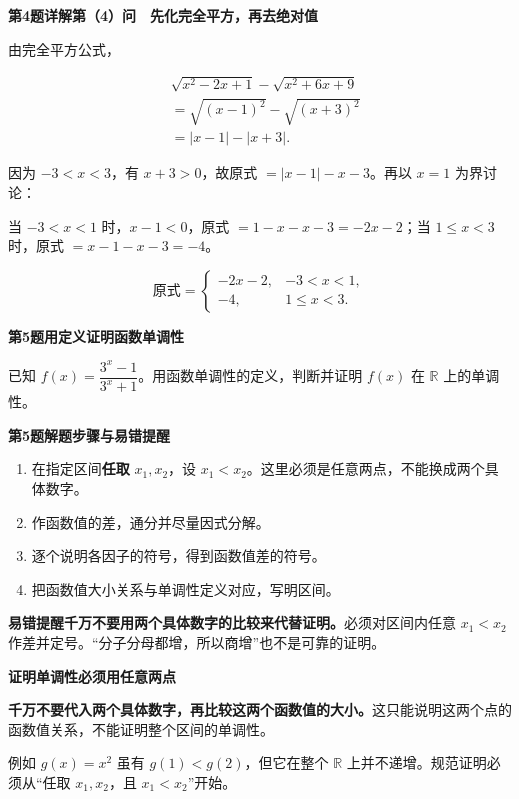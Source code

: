 \documentclass[UTF8,10pt,aspectratio=169]{ctexbeamer}
\newcommand{\PageHeading}[1]{\begin{center}{\Large\bfseries #1}\end{center}\vspace{0.12cm}}
\begin{document}
\begin{frame}[t]
\PageHeading{第4题详解\quad 第（4）问　先化完全平方，再去绝对值}
由完全平方公式，
\par
\pause
\[\begin{aligned}&\sqrt{x^2-2x+1}-\sqrt{x^2+6x+9}\\&=\sqrt{(x-1)^2}-\sqrt{(x+3)^2}\\&=|x-1|-|x+3|.\end{aligned}\]
\par
因为 $-3<x<3$，有 $x+3>0$，故原式 $=|x-1|-x-3$。再以 $x=1$ 为界讨论：
\par
当 $-3<x<1$ 时，$x-1<0$，原式 $=1-x-x-3=-2x-2$；当 $1\le x<3$ 时，原式 $=x-1-x-3=-4$。
\par
\[\boxed{\text{原式}=\begin{cases}-2x-2,&-3<x<1,\\-4,&1\le x<3.\end{cases}}\]
\par
\end{frame}
\begin{frame}[t]
\PageHeading{第5题\quad 用定义证明函数单调性}
已知 $f(x)=\dfrac{3^x-1}{3^x+1}$。用函数单调性的定义，判断并证明 $f(x)$ 在 $\mathbb R$ 上的单调性。
\par
\end{frame}
\begin{frame}[t]
\PageHeading{第5题\quad 解题步骤与易错提醒}
\begin{enumerate}\item 在指定区间\textbf{任取} $x_1,x_2$，设 $x_1<x_2$。这里必须是任意两点，不能换成两个具体数字。
\item 作函数值的差，通分并尽量因式分解。
\item 逐个说明各因子的符号，得到函数值差的符号。
\item 把函数值大小关系与单调性定义对应，写明区间。\end{enumerate}
\par
\pause
\vspace{0.18cm}\textbf{易错提醒}\quad \textbf{千万不要用两个具体数字的比较来代替证明。}必须对区间内任意 $x_1<x_2$ 作差并定号。“分子分母都增，所以商增”也不是可靠的证明。
\par
\end{frame}
\begin{frame}[t]
\PageHeading{证明单调性必须用任意两点}
\textbf{千万不要代入两个具体数字，再比较这两个函数值的大小。}这只能说明这两个点的函数值关系，不能证明整个区间的单调性。
\par
\pause
例如 $g(x)=x^2$ 虽有 $g(1)<g(2)$，但它在整个 $\mathbb R$ 上并不递增。规范证明必须从“任取 $x_1,x_2$，且 $x_1<x_2$”开始。
\par
\end{frame}
\end{document}
